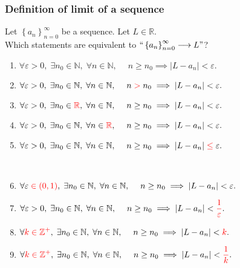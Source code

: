 \documentclass[14pt]{beamer}
\newcommand {\DS} [1] {${\displaystyle #1}$}
\newcommand {\R}{\mathbb{R}}
\newcommand {\Z}{\mathbb{Z}}
\newcommand {\N}{\mathbb{N}}
\newcommand{\e}{\varepsilon}
\newcommand{\rojo}[1]{{\color{red} #1}}
\newcommand{\setsize}[1]{\fontsize{#1}{#1}\selectfont} %
\newcommand{\smallerfont}{\setsize{13}} %
\newcommand{\an}{\left\{ a_n \right\}_{n=0}^{\infty}}
\begin{document}
\begin{frame}[t]
\smallerfont
\frametitle{Definition of limit of a sequence}

Let \DS{\an} be a sequence.  Let \DS{L \in \R}.  \\
Which statements are equivalent to  \DS{``\an \longrightarrow L"}?

\begin{enumerate}
	\item \DS{\forall \e>0, \; \exists n_0 \in \N, \; \forall n \in \N, \; \quad n \geq n_0 \implies |L-a_n| < \e.}
	\item \DS{\forall \e>0, \; \exists n_0 \in \N, \; \forall n \in \N, \; \quad n \; \rojo{ > } \; n_0 \implies |L-a_n| < \e.}
	\item \DS{\forall \e>0, \; \exists n_0 \in \rojo{\R}, \; \forall n \in  \N, \; \quad n \geq n_0 \implies |L-a_n| < \e.}
	\item \DS{\forall \e>0, \; \exists n_0 \in \N, \; \forall n \in  \rojo{ \R}, \; \quad n \geq n_0 \implies |L-a_n| < \e.}
	\item \DS{\forall \e>0, \; \exists n_0 \in \N, \; \forall n \in \N, \; \quad n \geq n_0 \implies |L-a_n| \; \rojo{\leq} \; \e.}
	
	\
	\item \DS{\forall \e \; \rojo{\in (0,1)}, \; \exists n_0 \in \N, \; \forall n \in \N, \; \quad n \geq n_0 \implies |L-a_n| < \e.}
	\item \DS{\forall \e>0, \; \exists n_0 \in \N, \; \forall n \in \N, \; \quad n \geq n_0 \implies |L-a_n| < \rojo{\frac{1}{\e}}.}
	\item \DS{\forall \rojo{k \in \Z^{+}}, \; \exists n_0 \in \N, \; \forall n \in \N, \; \quad n \geq n_0 \implies |L-a_n| < \rojo{k}.}
	\item \DS{\forall \rojo{k \in \Z^{+}}, \; \exists n_0 \in \N, \; \forall n \in \N, \; \quad n \geq n_0 \implies |L-a_n| < \rojo{\frac{1}{k}}.}
\end{enumerate}


\end{frame}
\end{document}
